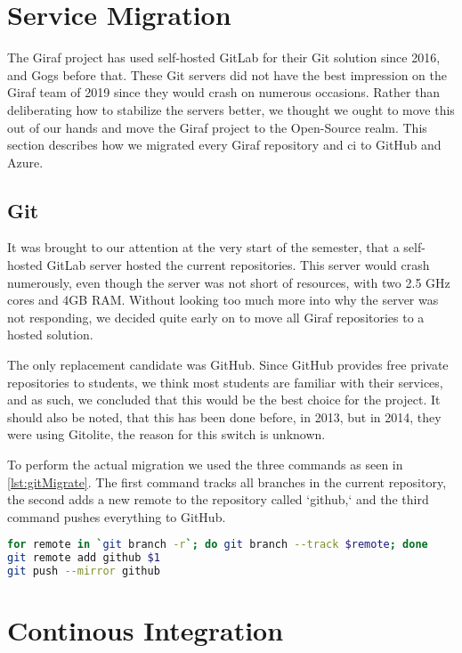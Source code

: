 
\section{Service Migration}\label{sec:GitAndCI}

The Giraf project has used self-hosted GitLab for their Git solution since 2016\cite{SW611F16}, and Gogs before that\cite{SW603F15}. These Git servers did not have the best impression on the Giraf team of 2019 since they would crash on numerous occasions. Rather than deliberating how to stabilize the servers better, we thought we ought to move this out of our hands and move the Giraf project to the Open-Source realm. This section describes how we migrated every Giraf repository and \gls{ci} to GitHub and Azure.

\subsection{Git}

It was brought to our attention at the very start of the semester, that a self-hosted GitLab server hosted the current repositories. This server would crash numerously, even though the server was not short of resources, with two 2.5 GHz cores and 4GB RAM. Without looking too much more into why the server was not responding, we decided quite early on to move all Giraf repositories to a hosted solution. 

The only replacement candidate was GitHub. Since GitHub provides free private repositories to students, we think most students are familiar with their services, and as such, we concluded that this would be the best choice for the project. It should also be noted, that this has been done before, in 2013\cite{SW601F13}, but in 2014, they were using Gitolite\cite{SW613F14}, the reason for this switch is unknown.

To perform the actual migration we used the three commands as seen in \autoref{lst:gitMigrate}. The first command tracks all branches in the current repository, the second adds a new remote to the repository called `github,` and the third command pushes everything to GitHub.

\begin{lstlisting}[language=bash,label={lst:gitMigrate},caption={Git Migration code}]
for remote in `git branch -r`; do git branch --track $remote; done
git remote add github $1
git push --mirror github
\end{lstlisting}

\section{Continous Integration}

